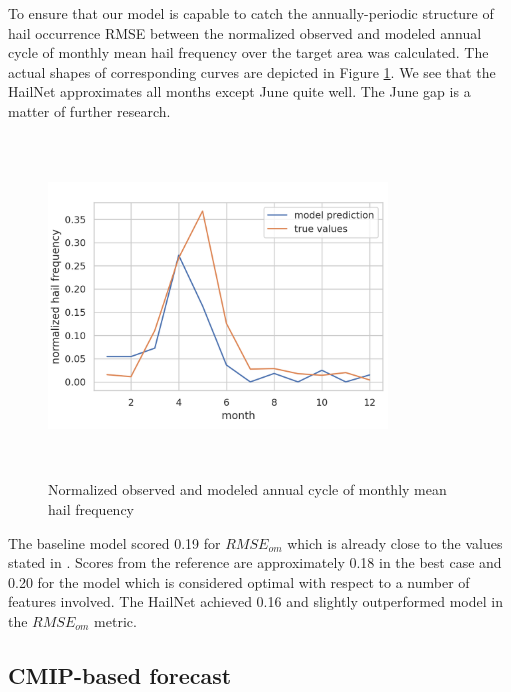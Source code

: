 \documentclass[conference]{IEEEtran}
\begin{document}
To ensure that our model is capable to catch the annually-periodic structure of hail occurrence RMSE between the normalized observed and modeled annual cycle of monthly mean hail frequency over the target area was calculated. The actual shapes of corresponding curves are depicted in Figure \ref{fig: normalized-annual-cycle}. We see that the HailNet approximates all months except June quite well. The June gap is a matter of further research.

\begin{figure}[htbp]
\centerline{\includegraphics[width=9cm,height=9cm,keepaspectratio]{normalized_annual_cycle.png}}
\caption{Normalized observed and modeled annual cycle of monthly mean hail frequency}
\label{fig: normalized-annual-cycle}
\end{figure}

The baseline model scored 0.19 for $RMSE_{om}$ which is already close to the values stated in \cite{PREIN201810}. Scores from the reference are approximately 0.18 in the best case and 0.20 for the model which is considered optimal with respect to a number of features involved. The HailNet achieved 0.16 and slightly outperformed \cite{PREIN201810} model in the $RMSE_{om}$ metric.

\subsection{CMIP-based forecast}
\end{document}
